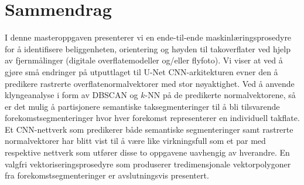 \chapter*{Sammendrag}

I denne masteroppgaven presenterer vi en ende-til-ende maskinlæringsprosedyre for å identifisere beliggenheten, orientering og høyden til takoverflater ved hjelp av fjernmålinger (digitale overflatemodeller og/eller flyfoto).
Vi viser at ved å gjøre små endringer på utputtlaget til U-Net CNN-arkitekturen evner den å predikere rastrerte overflatenormalvektorer med stor nøyaktighet.
Ved å anvende klyngeanalyse i form av DBSCAN og $k$-NN på de predikerte normalvektorene, så er det mulig å partisjonere semantiske taksegmenteringer til å bli tilsvarende forekomstsegmenteringer hvor hver forekomst representerer en individuell takflate.
Et CNN-nettverk som predikerer både semantiske segmenteringer samt rastrerte normalvektorer har blitt vist til å være like virkningsfull som et par med respektive nettverk som utfører disse to oppgavene uavhengig av hverandre.
En valgfri vektoriseringsprosedyre som produserer tredimensjonale vektorpolygoner fra forekomstsegmenteringer er avslutningsvis presentert.
